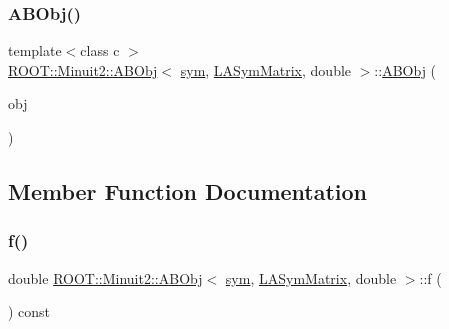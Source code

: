 \mbox{\label{classROOT_1_1Minuit2_1_1ABObj_3_01sym_00_01LASymMatrix_00_01double_01_4_a2632d99f281d85d56d8cd843e58eeac8}} 
\subsubsection{\texorpdfstring{ABObj()}{ABObj()}\hspace{0.1cm}{\footnotesize\ttfamily [8/8]}}
{\footnotesize\ttfamily template$<$class c $>$ \\
\mbox{\hyperlink{classROOT_1_1Minuit2_1_1ABObj}{R\+O\+O\+T\+::\+Minuit2\+::\+A\+B\+Obj}}$<$ \mbox{\hyperlink{classROOT_1_1Minuit2_1_1sym}{sym}}, \mbox{\hyperlink{classROOT_1_1Minuit2_1_1LASymMatrix}{L\+A\+Sym\+Matrix}}, double $>$\+::\mbox{\hyperlink{classROOT_1_1Minuit2_1_1ABObj}{A\+B\+Obj}} (\begin{DoxyParamCaption}\item[{const \mbox{\hyperlink{classROOT_1_1Minuit2_1_1ABObj}{A\+B\+Obj}}$<$ \mbox{\hyperlink{classROOT_1_1Minuit2_1_1vec}{vec}}, \mbox{\hyperlink{classROOT_1_1Minuit2_1_1LASymMatrix}{L\+A\+Sym\+Matrix}}, c $>$ \&}]{obj }\end{DoxyParamCaption})\hspace{0.3cm}{\ttfamily [inline]}}



\subsection{Member Function Documentation}
\mbox{\label{classROOT_1_1Minuit2_1_1ABObj_3_01sym_00_01LASymMatrix_00_01double_01_4_ad664e57b0a6720ab9c267c662c76b78f}} 
\subsubsection{\texorpdfstring{f()}{f()}\hspace{0.1cm}{\footnotesize\ttfamily [1/2]}}
{\footnotesize\ttfamily double \mbox{\hyperlink{classROOT_1_1Minuit2_1_1ABObj}{R\+O\+O\+T\+::\+Minuit2\+::\+A\+B\+Obj}}$<$ \mbox{\hyperlink{classROOT_1_1Minuit2_1_1sym}{sym}}, \mbox{\hyperlink{classROOT_1_1Minuit2_1_1LASymMatrix}{L\+A\+Sym\+Matrix}}, double $>$\+::f (\begin{DoxyParamCaption}{ }\end{DoxyParamCaption}) const\hspace{0.3cm}{\ttfamily [inline]}}

